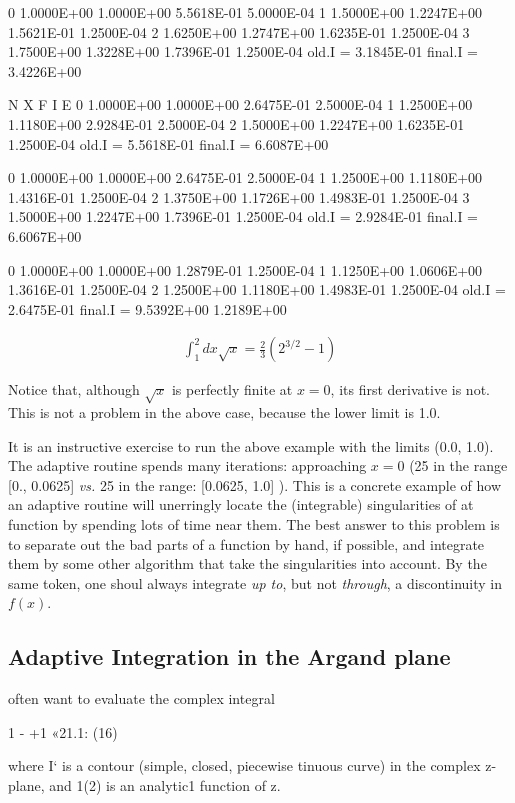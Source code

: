 0 1.0000E+00  1.0000E+00 5.5618E-01 5.0000E-04
1 1.5000E+00  1.2247E+00 1.5621E-01 1.2500E-04
2 1.6250E+00  1.2747E+00 1.6235E-01 1.2500E-04
3 1.7500E+00  1.3228E+00 1.7396E-01 1.2500E-04
old.I = 3.1845E-01  ﬁnal.I = 3.4226E+00

N      X            F          I             E
0 1.0000E+00  1.0000E+00 2.6475E-01 2.5000E-04
1 1.2500E+00  1.1180E+00 2.9284E-01 2.5000E-04
2 1.5000E+00  1.2247E+00 1.6235E-01 1.2500E-04
old.I = 5.5618E-01    ﬁnal.I = 6.6087E+00

0 1.0000E+00  1.0000E+00 2.6475E-01 2.5000E-04
1 1.2500E+00  1.1180E+00 1.4316E-01 1.2500E-04
2 1.3750E+00  1.1726E+00 1.4983E-01 1.2500E-04
3 1.5000E+00  1.2247E+00 1.7396E-01 1.2500E-04
old.I = 2.9284E-01  ﬁnal.I = 6.6067E+00

0 1.0000E+00  1.0000E+00 1.2879E-01 1.2500E-04
1 1.1250E+00  1.0606E+00 1.3616E-01 1.2500E-04
2 1.2500E+00  1.1180E+00 1.4983E-01 1.2500E-04
old.I = 2.6475E-01  ﬁnal.I = 9.5392E+00
1.2189E+00

\begin{align}
\int_{1}^{2}dx\sqrt{x} = \frac{2}{3} \left( 2^{3/2} - 1 \right)
\end{align}

Notice that, although $\sqrt{x}$ is perfectly finite at $x = 0$, its ﬁrst derivative is not. This is not a problem in the above case, because the lower limit is 1.0.

It is an instructive exercise to run the above example with the limits (0.0, 1.0). The adaptive routine spends many iterations: approaching $x = 0$ (25 in the range [0., 0.0625] \textit{vs.} 25 in the range: [0.0625, 1.0] ). This is a concrete example of how an adaptive routine will unerringly locate the (integrable) singularities of at function by spending lots of time near them. The best answer to this problem is to separate out the bad parts of a function by hand, if possible, and integrate them by some other algorithm that take the singularities into account. By the same token, one shoul always integrate \textit{up to}, but not \textit{through}, a discontinuity in $f(x)$.

\subsection{Adaptive Integration in the Argand plane}
 often want to evaluate the complex integral

1 - +1 «21.1: (16)

where I‘ is a contour (simple, closed, piecewise tinuous curve)
in the complex z-plane, and 1(2) is an analytic1 function of z.

